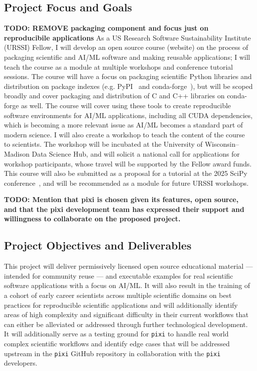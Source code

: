 \documentclass[letterpaper, 11pt]{article}
\newcommand{\fullinstitute}{University of Wisconsin--Madison}
\newcommand{\fullprogram}{US Research Software Sustainability Institute}
\newcommand{\program}{URSSI}
\begin{document}
\subsection{Project Focus and Goals}
\textbf{TODO: REMOVE packaging component and focus just on reproducibile applications}
As a \fullprogram{} (\program{}) Fellow, I will develop an open source course (website) on the process of packaging scientific and AI/ML software and making reusable applications; I will teach the course as a module at multiple workshops and conference tutorial sessions.
The course will have a focus on packaging scientific Python libraries and distribution on package indexes (e.g. PyPI~\cite{PyPI_website} and conda-forge~\cite{conda-forge_community}), but will be scoped broadly and cover packaging and distribution of C and C++ libraries on conda-forge as well.
The course will cover using these tools to create reproducible software environments for AI/ML applications, including all CUDA dependencies, which is becoming a more relevant issue as AI/ML becomes a standard part of modern science.
I will also create a workshop to teach the content of the course to scientists.
The workshop will be incubated at the \fullinstitute{} Data Science Hub, and will solicit a national call for applications for workshop participants, whose travel will be supported by the Fellow award funds.
This course will also be submitted as a proposal for a tutorial at the 2025 SciPy conference~\cite{scipy-2025}, and will be recommended as a module for future URSSI workshops.

\textbf{TODO: Mention that pixi is chosen given its features, open source, and that the pixi development team has expressed their support and willingness to collaborate on the proposed project.}

\subsection{Project Objectives and Deliverables}
This project will deliver permissively licensed open source educational material --- intended for community reuse --- and executable examples for real scientific software applications with a focus on AI/ML.
It will also result in the training of a cohort of early career scientists across multiple scientific domains on best practices for reproducible scientific applications and will additionally identify areas of high complexity and significant difficulty in their current workflows that can either be alleviated or addressed through further technological development.
It will additionally serve as a testing ground for \texttt{pixi} to handle real world complex scientific workflows and identify edge cases that will be addressed upstream in the \texttt{pixi} GitHub repository in collaboration with the \texttt{pixi} developers.
\end{document}
